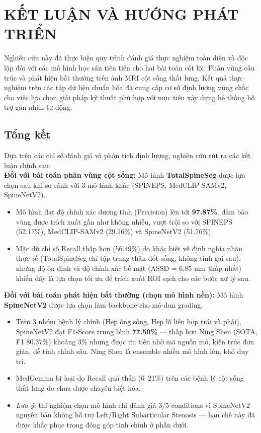 \chapter{KẾT LUẬN VÀ HƯỚNG PHÁT TRIỂN}
Nghiên cứu này đã thực hiện quy trình đánh giá thực nghiệm toàn diện và độc lập đối với các mô hình học sâu tiên tiến cho hai bài toán cốt lõi: Phân vùng cấu trúc và phát hiện bất thường trên ảnh MRI cột sống thắt lưng. Kết quả thực nghiệm trên các tập dữ liệu chuẩn hóa đã cung cấp cơ sở định lượng vững chắc cho việc lựa chọn giải pháp kỹ thuật phù hợp với mục tiêu xây dựng hệ thống hỗ trợ gán nhãn tự động.
\section{Tổng kết}
Dựa trên các chỉ số đánh giá và phân tích định lượng, nghiên cứu rút ra các kết luận chính sau: \\

\textbf{Đối với bài toán phân vùng cột sống:} Mô hình \textbf{TotalSpineSeg} được lựa chọn sau khi so sánh với 3 mô hình khác (SPINEPS, MedCLIP-SAMv2, SpineNetV2).
    \begin{itemize}
        \item Mô hình đạt độ chính xác dương tính (Precision) lên tới \textbf{97.87\%}, đảm bảo vùng được trích xuất gần như không nhiễu, vượt trội so với SPINEPS (52.17\%), MedCLIP-SAMv2 (29.16\%) và SpineNetV2 (51.76\%).
        \item Mặc dù chỉ số Recall thấp hơn (56.49\%) do khác biệt về định nghĩa nhãn thực tế (TotalSpineSeg chỉ tập trung thân đốt sống, không tính gai sau), nhưng độ ổn định và độ chính xác bề mặt (ASSD = 6.85 mm thấp nhất) khiến đây là lựa chọn tối ưu để trích xuất ROI sạch cho các bước xử lý sau.
    \end{itemize}

\textbf{Đối với bài toán phát hiện bất thường (chọn mô hình nền):} Mô hình \textbf{SpineNetV2} được lựa chọn làm backbone cho mô-đun grading.
    \begin{itemize}
        \item Trên 3 nhóm bệnh lý chính (Hẹp ống sống, Hẹp lỗ liên hợp trái và phải), SpineNetV2 đạt F1-Score trung bình \textbf{77.50\%} --- thấp hơn Ning Shen (SOTA, F1 80.37\%) khoảng 3\% nhưng được ưu tiên nhờ mã nguồn mở, kiến trúc đơn giản, dễ tinh chỉnh sâu. Ning Shen là ensemble nhiều mô hình lớn, khó duy trì.
        \item MedGemma bị loại do Recall quá thấp (6--21\%) trên các bệnh lý cột sống thắt lưng do chưa được chuyên biệt hóa.
        \item \emph{Lưu ý:} thí nghiệm chọn mô hình chỉ đánh giá 3/5 conditions vì SpineNetV2 nguyên bản không hỗ trợ Left/Right Subarticular Stenosis --- hạn chế này đã được khắc phục trong đóng góp tinh chỉnh ở phần dưới.
    \end{itemize}

